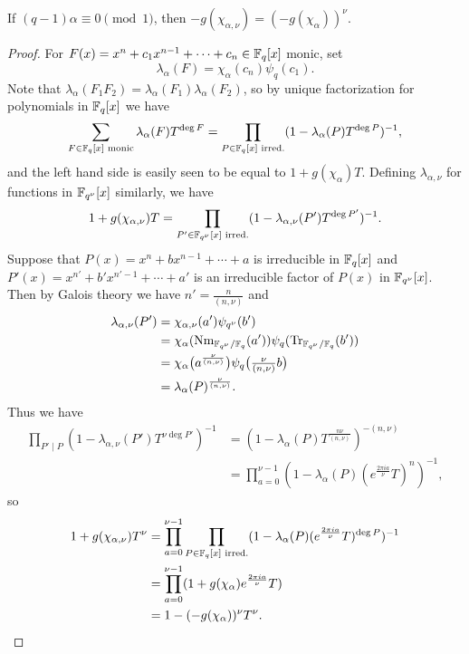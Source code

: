 \begin{thm} If $(q-1)\alpha \equiv 0 \pmod{1}$, then $-g(\chi_{\alpha,\nu}) = (-g(\chi_{\alpha}))^{\nu}$.
\end{thm}
\begin{proof} For $F(x) = x^n + c_1x^{n-1} + \cdots + c_n \in \mathbb{F}_q[x]$ monic, set
\[
\lambda_{\alpha}(F) = \chi_{\alpha}(c_n)\psi_q(c_1).
\]
Note that $\lambda_{\alpha}(F_1F_2) = \lambda_{\alpha}(F_1)\lambda_{\alpha}(F_2)$, so by unique factorization for polynomials in $\mathbb{F}_q[x]$ we have
\[
\sum_{F \in \mathbb{F}_q[x]\text{ monic}} \lambda_\alpha(F)T^{\deg F} = \prod_{P\in \mathbb{F}_q[x]\text{ irred.}} (1-\lambda_\alpha(P)T^{\deg P})^{-1},
\]
and the left hand side is easily seen to be equal to $1 + g(\chi_\alpha)T$.
Defining $\lambda_{\alpha,\nu}$ for functions in $\mathbb{F}_{q^\nu}[x]$ similarly, we have
\[
1 + g(\chi_{\alpha,\nu})T = \prod_{P'\in\mathbb{F}_{q^\nu}[x]\text{ irred.}} (1-\lambda_{\alpha,\nu}(P')T^{\deg P'})^{-1}.
\]
Suppose that $P(x) = x^n + bx^{n-1} + \cdots + a$ is irreducible in $\mathbb{F}_q[x]$ and $P'(x) = x^{n'} + b'x^{n'-1} + \cdots + a'$ is an irreducible factor of $P(x)$ in $\mathbb{F}_{q^\nu}[x]$. Then by Galois theory we have $n' = \frac{n}{(n,\nu)}$ and
\begin{align*}
\lambda_{\alpha,\nu}(P') &= \chi_{\alpha,\nu}(a')\psi_{q^\nu}(b')\\
&= \chi_\alpha(\operatorname{Nm}_{\mathbb{F}_{q^\nu}/\mathbb{F}_q}(a'))\psi_q(\operatorname{Tr}_{\mathbb{F}_{q^\nu}/\mathbb{F}_q}(b'))\\
&= \chi_\alpha\big(a^\frac{\nu}{(n,\nu)}\big)\psi_q\big(\tfrac{\nu}{(n,\nu)}b\big)\\
&= \lambda_\alpha(P)^{\frac{\nu}{(n,\nu)}}.
\end{align*}
Thus we have
\begin{align*}
\prod_{P'\mid P} (1-\lambda_{\alpha,\nu}(P')T^{\nu \deg P'})^{-1} &= (1-\lambda_\alpha(P)T^\frac{n\nu}{(n,\nu)})^{-(n,\nu)}\\
&= \prod_{a=0}^{\nu-1} (1-\lambda_\alpha(P)(e^{\frac{2\pi ia}{\nu}}T)^n)^{-1},
\end{align*}
so
\begin{align*}
1 + g(\chi_{\alpha,\nu})T^\nu &= \prod_{a=0}^{\nu-1}\prod_{P\in\mathbb{F}_q[x]\text{ irred.}}(1-\lambda_\alpha(P)(e^{\frac{2\pi ia}{\nu}}T)^{\deg P})^{-1}\\
&= \prod_{a=0}^{\nu-1} (1+g(\chi_\alpha)e^{\frac{2\pi ia}{\nu}}T)\\
&= 1-(-g(\chi_\alpha))^\nu T^\nu.\qedhere
\end{align*}
\end{proof}

